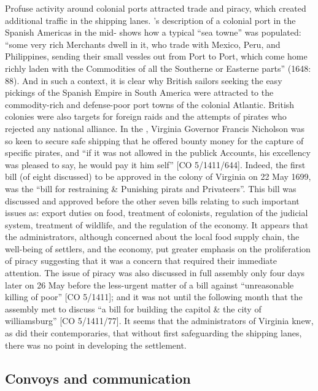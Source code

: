 Profuse activity around colonial ports attracted  trade and piracy, which created additional traffic in the shipping lanes. \citeauthor{Gage1648}’s description of a colonial port in the Spanish Americas in the mid- shows how a typical “sea towne” was populated: “some very rich Merchants dwell in it, who trade with Mexico, Peru, and Philippines, sending their small vessles out from Port to Port, which come home richly laden with the Commodities of all the Southerne or Easterne parts” (1648: 88). And in such a context, it is clear why British sailors seeking the easy pickings of the Spanish Empire in South America were attracted to the commodity-rich and defense-poor port towns of the colonial Atlantic. British colonies were also targets for foreign raids and the attempts of pirates who rejected any national alliance. In the , Virginia Governor Francis Nicholson was so keen to secure safe shipping that he offered bounty money for the capture of specific pirates, and “if it was not allowed in the publick Accounts, his excellency was pleased to say, he would pay it him self” [CO 5/1411/644].  Indeed, the first bill (of eight discussed) to be approved in the colony of Virginia on 22 May {1699}, was the “bill for restraining \& Punishing pirats and Privateers”. This bill was discussed and approved before the other seven bills relating to such important issues as: export duties on food, treatment of colonists, regulation of the judicial system, treatment of wildlife, and the regulation of the economy. It appears that the administrators, although concerned about the local food supply chain, the well-being of settlers, and the economy, put greater emphasis on the proliferation of piracy
suggesting that it was a concern that required their immediate attention. The issue of piracy was also discussed in full assembly only four days later on 26 May before the less-urgent matter of a bill against “unreasonable killing of poor” [CO 5/1411]; and it was not until the following month that the assembly met to discuss “a bill for building the capitol \& the city of williamsburg” [CO 5/1411/77]. It seems that  the administrators of Virginia knew, as did their contemporaries, that without first safeguarding the shipping lanes, there was no point in developing the settlement. 

\subsection{{Convoys and communication}}\label{sec:4.3.2}

